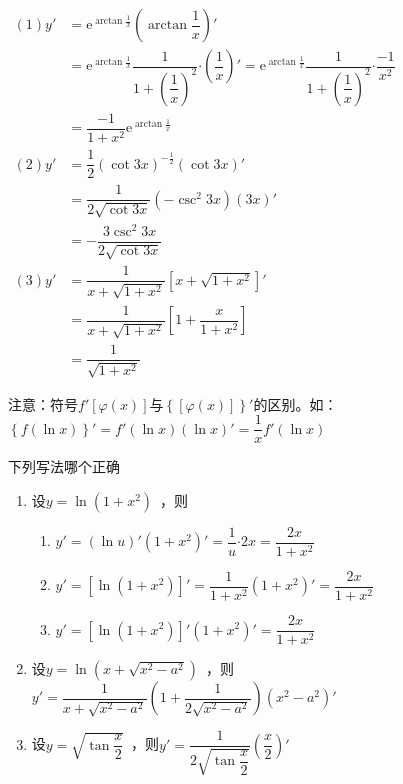 \begin{solution}
$\begin{aligned}
(1) y'&=\mathrm{e}^{\arctan\tfrac{1}{x}}\left(\arctan \dfrac{1}{x}\right)'\\
&=\mathrm{e}^{\arctan \tfrac{1}{x}}\dfrac{1}{1+\left(\dfrac{1}{x}\right)^2}\bm\cdot \left(\dfrac{1}{x}\right)'=\mathrm{e}^{\arctan \tfrac{1}{x}}\dfrac{1}{1+\left(\dfrac{1}{x}\right)^2}\bm\cdot \dfrac{-1}{x^2}\\
&=\dfrac{-1}{1+x^2}\mathrm{e}^{\arctan \tfrac{1}{x}}
\end{aligned}$\\
$\begin{aligned}
(2)y'&=\dfrac{1}{2}\left(\cot 3x\right)^{-\tfrac{1}{2}}\left(\cot 3x\right)'\\
&=\dfrac{1}{2\sqrt{\cot 3x}}\left(-\csc^2 3x\right)\left(3x\right)'\\
&=-\dfrac{3\csc^2 3x}{2\sqrt{\cot 3x}}
\end{aligned}$\\
$\begin{aligned}
(3)y'&=\dfrac{1}{x+\sqrt{1+x^2}}\left[x+\sqrt{1+x^2}\right]'\\
&=\dfrac{1}{x+\sqrt{1+x^2}}\left[1+\dfrac{x}{1+x^2}\right]\\
&=\dfrac{1}{\sqrt{1+x^2}}
\end{aligned}$
\end{solution}
{\kaishu \color{blue}注意：符号$f'\left[\varphi(x)\right]$与$\left\{\left[\varphi(x)\right]\right\}'$的区别。如：$\left\{f\left(\ln x\right)\right\}'=f'\left(\ln x\right)\left(\ln x\right)'=\dfrac{1}{x}f'\left(\ln x\right)$
}
\begin{example}
下列写法哪个正确
\begin{enumerate}[1.]
\item 设$y=\ln \left(1+x^2\right)$~，则
\begin{enumerate}[(1)]
\item $y'=\left(\ln u\right)'\left(1+x^2\right)'=\dfrac{1}{u}\bm\cdot 2x=\dfrac{2x}{1+x^2}$
\item $y'=\left[\ln \left(1+x^2\right)\right]'=\dfrac{1}{1+x^2}\left(1+x^2\right)'=\dfrac{2x}{1+x^2}$
\item $y'=\left[\ln \left(1+x^2\right)\right]'\left(1+x^2\right)'=\dfrac{2x}{1+x^2}$
\end{enumerate}
\item 设$y=\ln \left(x+\sqrt{x^2-a^2}\right)$~，则$y'=\dfrac{1}{x+\sqrt{x^2-a^2}}\left(1+\dfrac{1}{2\sqrt{x^2-a^2}}\right)\left(x^2-a^2\right)'$
\item 设$y=\sqrt{\tan \dfrac{x}{2}}$~，则$y'=\dfrac{1}{2\sqrt{\tan \dfrac{x}{2}}}\left(\dfrac{x}{2}\right)'$
\end{enumerate}
\end{example}
